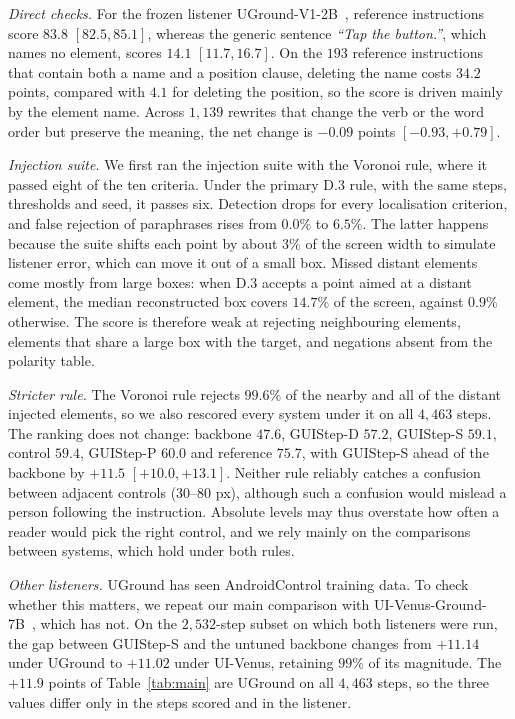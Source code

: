 \documentclass[runningheads,a4paper]{llncs}
\begin{document}
\textit{Direct checks.} For the frozen listener UGround-V1-2B~\cite{uground}, reference instructions score $83.8$
$[82.5,85.1]$, whereas the generic sentence \emph{``Tap the button.''}, which names no element,
scores $14.1$ $[11.7,16.7]$. On the $193$ reference instructions that
contain both a name and a position clause, deleting the name costs $34.2$ points, compared with
$4.1$ for deleting the position, so the score is driven mainly by the element name.  Across $1{,}139$ rewrites that change the verb or the word order but preserve the meaning, the net change is $-0.09$ points $[-0.93,+0.79]$.

\textit{Injection suite.} We first ran the injection suite with the Voronoi rule, where it passed eight of the ten criteria.
Under the primary D.3 rule, with the same steps, thresholds and seed, it passes six.
Detection drops for every localisation criterion, and false rejection of paraphrases rises from $0.0\%$ to $6.5\%$. The latter happens because the suite shifts each point by about $3\%$ of the screen width to simulate listener error, which can move it out of a small box. Missed distant elements come mostly from large boxes: when D.3 accepts a point aimed at a distant element, the median reconstructed box covers $14.7\%$ of the screen, against $0.9\%$ otherwise. The score is therefore weak at rejecting neighbouring elements, elements that share a large box with the target, and negations absent from the polarity table.

\textit{Stricter rule.} The Voronoi rule rejects $99.6\%$ of the nearby and all of the distant injected elements, so we also rescored every system under it on all $4{,}463$ steps. The ranking does not change: backbone $47.6$, \mbox{GUIStep-D}
$57.2$, \mbox{GUIStep-S} $59.1$, control $59.4$, \mbox{GUIStep-P} $60.0$ and reference $75.7$, with \mbox{GUIStep-S}
ahead of the backbone by $+11.5$ $[+10.0,+13.1]$. Neither rule reliably catches a confusion between
adjacent controls ($30$--$80$ px), although such a confusion would mislead a person following the instruction. Absolute levels may thus overstate how often a reader would pick the right
control, and we rely mainly on the comparisons between systems, which hold under both rules.

\textit{Other listeners.} UGround has seen AndroidControl training data. To check whether this matters, we repeat our main comparison with
UI-Venus-Ground-7B~\cite{uivenus}, which has not. On the $2{,}532$-step subset on which both listeners were run, the gap between \mbox{GUIStep-S} and the untuned backbone changes from $+11.14$ under
UGround to $+11.02$ under UI-Venus, retaining $99\%$ of its magnitude. The $+11.9$ points of
Table~\ref{tab:main} are UGround on all $4{,}463$ steps, so the three values differ only in the
steps scored and in the listener.
\end{document}
